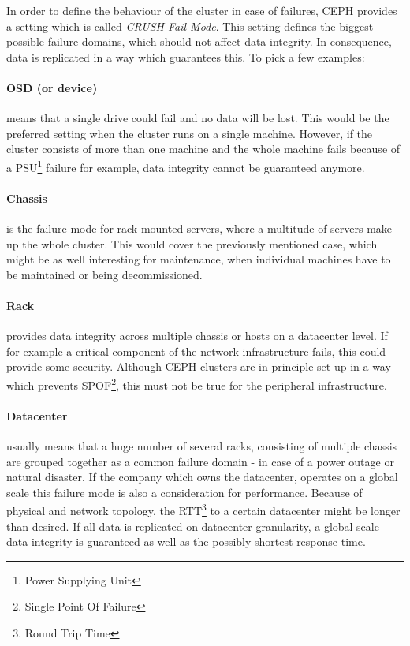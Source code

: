 \documentclass[titlepage, a4paper, 11pt]{scrartcl}
\begin{document}
                In order to define the behaviour of the cluster in case of failures, CEPH provides a setting
                which is called \textit{CRUSH Fail Mode}. This setting defines the biggest possible failure domains, 
                which should not affect data integrity\cite{crushFailure}. In consequence, data is replicated in a
                way which guarantees this. To pick a few examples: 

                \paragraph{OSD (or device)} means that a single drive could fail and no data will be lost.
                This would be the preferred setting when the cluster runs on a single machine. However, if the cluster
                consists of more than one machine and the whole machine fails because of a PSU\footnote{Power Supplying Unit} failure
                for example, data integrity cannot be guaranteed anymore.

                \paragraph{Chassis} is the failure mode for rack mounted servers, where a multitude of servers
                make up the whole cluster. This would cover the previously mentioned case, which might be as well interesting for maintenance,
                when individual machines have to be maintained or being decommissioned.
                
                \paragraph{Rack} provides data integrity across multiple chassis or hosts on a datacenter level. If for example
                a critical component of the network infrastructure fails, this could provide some security. Although CEPH clusters 
                are in principle set up in a way which prevents SPOF\footnote{Single Point Of Failure}, this must not be true for the
                peripheral infrastructure. 

                \paragraph{Datacenter} usually means that a huge number of several racks, consisting of multiple chassis are grouped
                together as a common failure domain - in case of a power outage or natural disaster. If the company which owns the datacenter,
                operates on a global scale this failure mode is also a consideration for performance. Because of physical and network
                topology, the RTT\footnote{Round Trip Time} to a certain datacenter might be longer than desired. If all data is replicated
                on datacenter granularity, a global scale data integrity is guaranteed as well as the possibly shortest response time.
\end{document}
